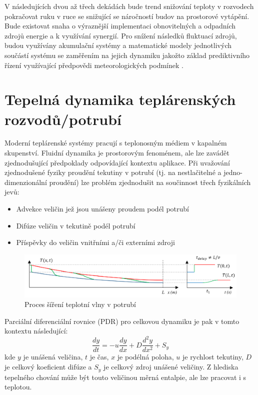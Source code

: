 V následujících dvou až třech dekádách bude trend snižování teploty v
rozvodech pokračovat ruku v ruce se snižující se náročností budov na prostorové
vytápění. Bude existovat snaha o výraznější implementaci obnovitelných a
odpadních zdrojů energie a k využívání synergií. Pro snížení následků fluktuací
zdrojů, budou využívány akumulační systémy a matematické modely jednotlivých
součástí systému se zaměřením na jejich dynamiku jakožto základ prediktivního
řízení využívající předpovědi meteorologických podmínek \cite{Lund2014}.

\section{Tepelná dynamika teplárenských rozvodů/potrubí}
\label{sec:HeatDynamics}
Moderní teplárenské systémy pracují s teplonosným médiem v kapalném skupenství.
Fluidní dynamika je prostorovým fenoménem, ale lze zavádět zjednodušující
předpoklady odpovídající kontextu aplikace. Při uvažování zjednodušené fyziky
proudění tekutiny v potrubí (tj. na nestlačitelné a jedno-dimenzionální
proudění) lze problém zjednodušit na součinnost třech fyzikálních jevů:

\begin{itemize}
  \item Advekce veličin jež jsou unášeny proudem podél potrubí
  \item Difúze veličin v tekutině podél potrubí
  \item Příspěvky do veličin vnitřními a/či externími zdroji
\end{itemize}

\begin{figure}[h] \capstart
  \label{fig:heatwave}
  \includegraphics[width=\textwidth]{figures/heat_front}
  \caption{Proces šíření teplotní vlny v potrubí}
\end{figure}

Parciální diferenciální rovnice (PDR) pro celkovou dynamiku je pak v tomto
kontextu následující:
\begin{equation}
  \label{eq:AdvDiff}
  \frac{dy}{dt} = -u \frac{dy}{dx} + D\frac{d^{2}y}{dx^2} + {S_y}
\end{equation}
kde \(y\) je unášená veličina, \(t\) je čas, \(x\) je podélná poloha, \(u\) je
rychlost tekutiny, \(D\) je celkový koeficient difúze a \(S_y\) je celkový
zdroj unášené veličiny. Z hlediska tepelného chování může být touto veličinou
měrná entalpie, ale lze pracovat i s teplotou.

